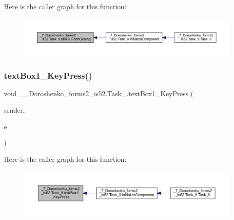 Here is the caller graph for this function\+:
\nopagebreak
\begin{figure}[H]
\begin{center}
\leavevmode
\includegraphics[width=350pt]{class__7___doroshenko__forms2__is52_1_1_task__9_af51986ccc846ac91671650739e1764a3_icgraph}
\end{center}
\end{figure}
\hypertarget{class__7___doroshenko__forms2__is52_1_1_task__9_aa5d0880b9c625e091b43b6aa410658ae}{}\label{class__7___doroshenko__forms2__is52_1_1_task__9_aa5d0880b9c625e091b43b6aa410658ae} 
\subsubsection{\texorpdfstring{text\+Box1\+\_\+\+Key\+Press()}{textBox1\_KeyPress()}}
{\footnotesize\ttfamily void \+\_\+\_\+\+Doroshenko\+\_\+forms2\+\_\+is52.\+Task\+\_.\+text\+Box1\+\_\+\+Key\+Press (\begin{DoxyParamCaption}\item[{object}]{sender,  }\item[{Key\+Press\+Event\+Args}]{e }\end{DoxyParamCaption})\hspace{0.3cm}{\ttfamily [private]}}

Here is the caller graph for this function\+:
\nopagebreak
\begin{figure}[H]
\begin{center}
\leavevmode
\includegraphics[width=350pt]{class__7___doroshenko__forms2__is52_1_1_task__9_aa5d0880b9c625e091b43b6aa410658ae_icgraph}
\end{center}
\end{figure}
\hypertarget{class__7___doroshenko__forms2__is52_1_1_task__9_afb796d1d759b3394c04953f05fea6a2d}{}\label{class__7___doroshenko__forms2__is52_1_1_task__9_afb796d1d759b3394c04953f05fea6a2d} 
